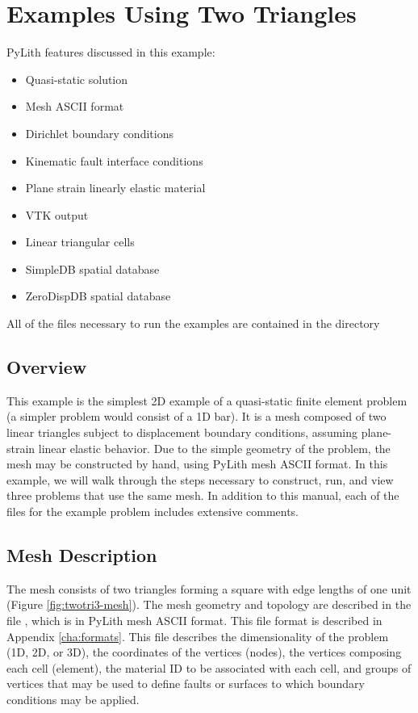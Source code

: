 
\section{Examples Using Two Triangles}
\label{sec:example:twotri3}

PyLith features discussed in this example:
\begin{itemize}
\item Quasi-static solution
\item Mesh ASCII format
\item Dirichlet boundary conditions
\item Kinematic fault interface conditions
\item Plane strain linearly elastic material
\item VTK output
\item Linear triangular cells
\item SimpleDB spatial database
\item ZeroDispDB spatial database
\end{itemize}
All of the files necessary to run the examples are contained in the
directory 


\subsection{Overview}

This example is the simplest 2D example of a quasi-static finite
element problem (a simpler problem would consist of a 1D bar). It
is a mesh composed of two linear triangles subject to displacement
boundary conditions, assuming plane-strain linear elastic behavior.
Due to the simple geometry of the problem, the mesh may be constructed
by hand, using PyLith mesh ASCII format. In this example, we will
walk through the steps necessary to construct, run, and view three
problems that use the same mesh. In addition to this manual, each
of the files for the example problem includes extensive comments.


\subsection{Mesh Description}

The mesh consists of two triangles forming a square with edge lengths
of one unit (Figure \vref{fig:twotri3-mesh}). The mesh geometry and
topology are described in the file , which is
in PyLith mesh ASCII format. This file format is described in Appendix
\vref{cha:formats}. This file describes the dimensionality of
the problem (1D, 2D, or 3D), the coordinates of the vertices (nodes),
the vertices composing each cell (element), the material ID to be
associated with each cell, and groups of vertices that may be used
to define faults or surfaces to which boundary conditions may be applied.

